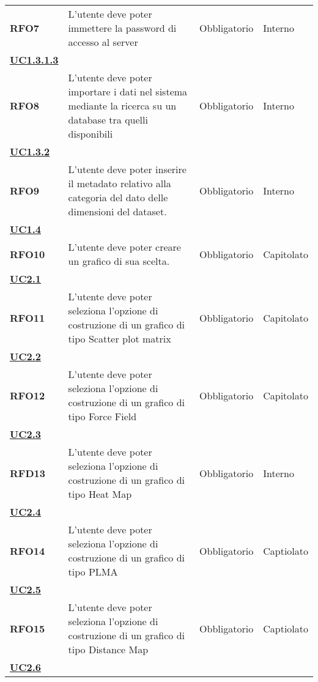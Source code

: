 \begin{longtable}[H]{>{\centering\bfseries}m{2cm} >{\centering}m{9cm} >{\centering}m{2.5cm} >{\centering\arraybackslash}m{2.5cm}}
    RFO7
    &   L'utente deve poter immettere la password di accesso al server
    & Obbligatorio
    & Interno \\ \hyperref[spar:uc1.3.1.3]{UC1.3.1.3}\\

    RFO8
    &   L'utente deve poter importare i dati nel sistema mediante la ricerca
        su un database tra quelli disponibili
    & Obbligatorio
    & Interno\\ \hyperref[par:uc1.3.2]{UC1.3.2}\\

    RFO9
    &   L'utente deve poter inserire il metadato relativo alla categoria
        del dato delle dimensioni del dataset.
    & Obbligatorio
    & Interno\\ \hyperref[ssub:uc1.4]{UC1.4}\\

    RFO10
    & L'utente deve poter creare un grafico di sua scelta.
    & Obbligatorio
    & Capitolato\\ \hyperref[ssub:uc2.1]{UC2.1}\\

    RFO11
    & L'utente deve poter seleziona l'opzione di costruzione di un grafico di tipo Scatter plot matrix
    & Obbligatorio
    & Capitolato \\  \hyperref[ssub:uc2.2]{UC2.2}\\

    RFO12
    & L'utente deve poter seleziona l'opzione di costruzione di un grafico di tipo Force Field
    & Obbligatorio
    & Capitolato \\ \hyperref[ssub:uc2.3]{UC2.3}\\
    
    RFD13
    & L'utente deve poter seleziona l'opzione di costruzione di un grafico di tipo Heat Map
    & Obbligatorio
    & Interno \\ \hyperref[ssub:uc2.4]{UC2.4}\\

    RFO14
    & L'utente deve poter seleziona l'opzione di costruzione di un grafico di tipo PLMA
    & Obbligatorio
    & Captiolato \\  \hyperref[ssub:uc2.5]{UC2.5}\\

    RFO15
    & L'utente deve poter seleziona l'opzione di costruzione di un grafico di tipo Distance Map
    & Obbligatorio
    & Captiolato \\ \hyperref[ssub:UC2.6]{UC2.6}\\


\end{longtable}
